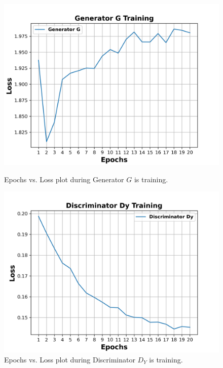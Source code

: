 \begin{figure}[H]
  \centering
  \begin{minipage}[b]{0.49\textwidth}
    \includegraphics[width=\textwidth]{images/Evaluation/GeneratorGTraining.png}
    \caption[Epochs vs. Loss plot during Generator $G$ is training.]{Epochs vs. Loss plot during Generator $G$ is training.}
    \label{fig:generatorG}
  \end{minipage}
  \hfill
  \begin{minipage}[b]{0.49\textwidth}
    \includegraphics[width=\textwidth]{images/Evaluation/DiscriminatorDyTraining.png}
    \caption[Epochs vs. Loss plot during Discriminator $D_Y$ is training.]{Epochs vs. Loss plot during Discriminator $D_Y$ is training.}
    \label{fig:discriminatorDy}
  \end{minipage}
\end{figure}
